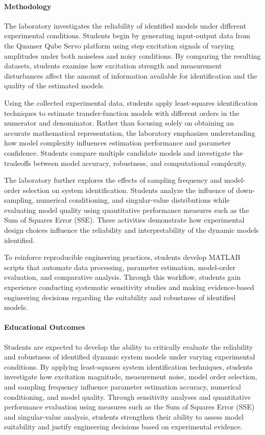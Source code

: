 \documentclass[journal]{IEEEtran}
\begin{document}
\paragraph{Methodology}
The laboratory
investigates the reliability of identified models under different experimental conditions. Students begin by generating input-output data from the Quanser Qube Servo platform using step excitation signals of varying amplitudes under both noiseless and noisy conditions. By comparing the resulting datasets, students examine how excitation strength and measurement disturbances affect the amount of information available for identification and the quality of the estimated models.

Using the collected experimental data, students apply least-squares identification techniques to estimate transfer-function models with different orders in the numerator and denominator. Rather than focusing solely on obtaining an accurate mathematical representation, the laboratory emphasizes understanding how model complexity influences estimation performance and parameter confidence. Students compare multiple candidate models and investigate the tradeoffs between model accuracy, robustness, and computational complexity.

The laboratory further explores the effects of sampling frequency and model-order selection on system identification. Students analyze the influence of down-sampling, numerical conditioning, and singular-value distributions while evaluating model quality using quantitative performance measures such as the Sum of Squares Error (SSE). These activities demonstrate how experimental design choices influence the reliability and interpretability of the dynamic models identified.

To reinforce reproducible engineering practices, students develop MATLAB scripts that automate data processing, parameter estimation, model-order evaluation, and comparative analysis. Through this workflow, students gain experience conducting systematic sensitivity studies and making evidence-based engineering decisions regarding the suitability and robustness of identified models.

\paragraph{Educational Outcomes}
Students are expected to develop the ability to critically evaluate the reliability and robustness of identified dynamic system models under varying experimental conditions. By applying least-squares system identification techniques, students investigate how excitation magnitude, measurement noise, model order selection, and sampling frequency influence parameter estimation accuracy, numerical conditioning, and model quality. Through sensitivity analyses and quantitative performance evaluation using measures such as the Sum of Squares Error (SSE) and singular-value analysis, students strengthen their ability to assess model suitability and justify engineering decisions based on experimental evidence.
\end{document}
